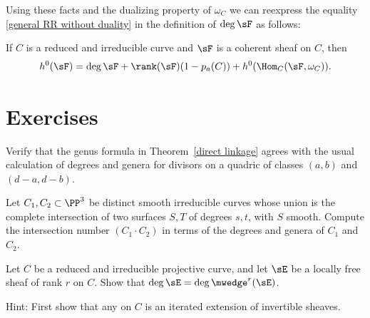 Using 
these facts and
the dualizing property of $\omega_C$ we can 
reexpress the equality
\eqref{general RR without duality} 
in the definition of $\deg\sF$ as follows:

\begin{theorem}\label{general RR with duality}
If $C$ is a reduced and irreducible curve and $\sF$ is a coherent sheaf
on $C$, then
$$
h^0(\sF) = \deg\sF + \rank(\sF)(1-p_a(C)) + h^0(\Hom_C(\sF, \omega_C)).
$$
\end{theorem}

\section{Exercises}

\begin{exercise}
Verify that the genus formula in Theorem~\ref{direct linkage} agrees with
the usual calculation of degrees and genera for divisors on a quadric of
classes $(a,b)$ and $(d-a, d-b)$.
\end{exercise}

\begin{exercise}
 Let $C_1, C_2\subset \PP^3$ be distinct smooth irreducible curves
whose union is the complete
intersection
of two surfaces $S,T$
of degrees $s,t$,
with $S$ smooth.
Compute the intersection number $(C_{1}\cdot C_{2})$
in terms of the degrees and genera of $C_{1}$ and $C_{2}$.
\end{exercise}

\begin{exercise}
Let $C$ be a reduced and irreducible projective curve, and let $\sE$
be a locally free sheaf of rank $r$ on $C$. Show that
$\deg \sE = \deg\mwedge^r(\sE)$.

Hint: First show that any 
%
on $C$ is an iterated
extension of invertible sheaves.
\end{exercise}

